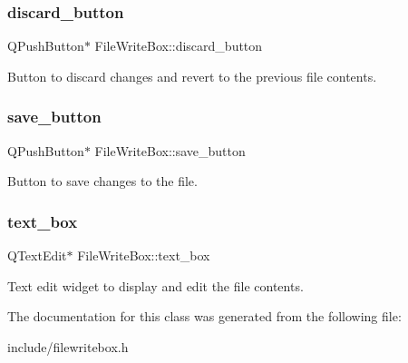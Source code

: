 \subsubsection{\texorpdfstring{discard\+\_\+button}{discard\_button}}
{\footnotesize\ttfamily Q\+Push\+Button$\ast$ File\+Write\+Box\+::discard\+\_\+button\hspace{0.3cm}{\ttfamily [private]}}

Button to discard changes and revert to the previous file contents. \mbox{\label{classFileWriteBox_a2ed017f414c666d3e31cb02cd39d909d}} 
\subsubsection{\texorpdfstring{save\+\_\+button}{save\_button}}
{\footnotesize\ttfamily Q\+Push\+Button$\ast$ File\+Write\+Box\+::save\+\_\+button\hspace{0.3cm}{\ttfamily [private]}}

Button to save changes to the file. \mbox{\label{classFileWriteBox_a0dd330297bb74bcfdda915aeb7561fb6}} 
\subsubsection{\texorpdfstring{text\+\_\+box}{text\_box}}
{\footnotesize\ttfamily Q\+Text\+Edit$\ast$ File\+Write\+Box\+::text\+\_\+box\hspace{0.3cm}{\ttfamily [private]}}

Text edit widget to display and edit the file contents. 

The documentation for this class was generated from the following file\+:\begin{DoxyCompactItemize}
\item 
include/filewritebox.\+h\end{DoxyCompactItemize}

